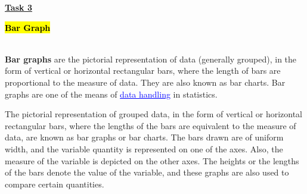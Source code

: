\documentclass[12pt a4paper]{article}
\begin{document}
\begin{center}
\HUGE \textbf{\uline{Task 3}}
\thispagestyle{empty}
\end{center}


\newpage
\thispagestyle{empty}

    
\begin{center}
\begin{Huge}
\hl{\textbf{Bar Graph}}
\end{Huge}
\end{center}

\newpage


\begin{huge}
\noindent \LARGE \newline 
\\
\textbf{Bar graphs} are the pictorial representation of data (generally grouped), in the form of vertical or horizontal rectangular bars, where the length of bars are proportional to the measure of data. They are also known as bar charts. Bar graphs are one of the means of \textcolor{blue}{\uline{data handling}} in statistics.   \\
\end{huge}

\begin{huge}
\noindent \LARGE
The pictorial representation of grouped data, in the form of vertical or horizontal rectangular bars, where the lengths of the bars are equivalent to the measure of data, are known as bar graphs or bar charts. The bars drawn are of uniform width, and the variable quantity is represented on one of the axes. Also, the measure of the variable is depicted on the other axes. The heights or the lengths of the bars denote the value of the variable, and these graphs are also used to compare certain quantities. 
\end{huge}

\newpage

\hfill \break
\end{document}
